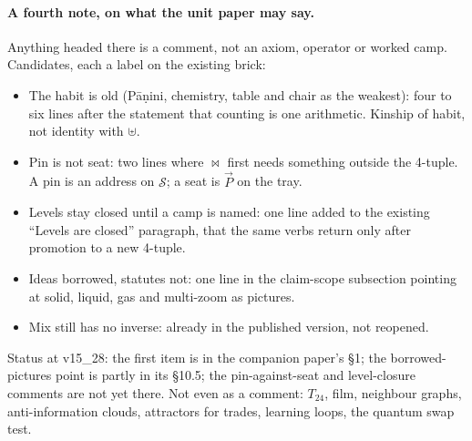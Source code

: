 \documentclass[12pt, a4paper]{article}
\begin{document}
\paragraph{A fourth note, on what the unit paper may say.} Anything
headed there is a comment, not an axiom, operator or worked camp.
Candidates, each a label on the existing brick:
\begin{itemize}
\item The habit is old (P\={a}\d{n}ini, chemistry, table and chair
      as the weakest): four to six lines after the statement that
      counting is one arithmetic. Kinship of habit, not identity with $\uplus$.
\item Pin is not seat: two lines where $\bowtie$ first needs
      something outside the 4-tuple. A pin is an address on
      $\mathcal{S}$; a seat is $\vec P$ on the tray.
\item Levels stay closed until a camp is named: one line added to
      the existing ``Levels are closed'' paragraph, that the same
      verbs return only after promotion to a new 4-tuple.
\item Ideas borrowed, statutes not: one line in the claim-scope
      subsection pointing at solid, liquid, gas and multi-zoom as
      pictures.
\item Mix still has no inverse: already in the published version,
      not reopened.
\end{itemize}
Status at v15\_28: the first item is in the companion paper's \S1; the borrowed-pictures point is partly in its
\S10.5; the pin-against-seat and level-closure comments are not yet there.
Not even as a comment: $T_{24}$, film, neighbour graphs,
anti-information clouds, attractors for trades, learning loops, the
quantum swap test.
\end{document}
